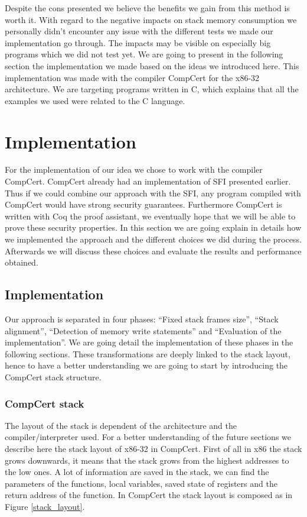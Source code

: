 \documentclass[11pt]{sdm}
\begin{document}
Despite the cons presented we believe the benefits we gain from this method is worth it. With regard to the negative impacts on stack memory consumption we personally didn't encounter any issue with the different tests we made our implementation go through. The impacts may be visible on especially big programs which we did not test yet.
We are going to present in the following section the implementation we made based on the ideas we introduced here. This implementation was made with the compiler CompCert for the x86-32 architecture. We are targeting programs written in C, which explains that all the examples we used were related to the C language.


\label{sec:section name}

\section{Implementation}
\label{sec:Implementation and analysis}

For the implementation of our idea we chose to work with the compiler CompCert. CompCert already had an implementation of SFI presented earlier. Thus if we could combine our approach with the SFI, any program compiled with CompCert would have strong security guarantees. Furthermore CompCert is written with Coq the proof assistant, we eventually hope that we will be able to prove these security properties. In this section we are going explain in details how we implemented the approach and the different choices we did during the process. Afterwards we will discuss these choices and evaluate the results and performance obtained.

\subsection{Implementation}
\label{sub:Implementation}
	Our approach is separated in four phases: ``Fixed stack frames size'', ``Stack alignment'', ``Detection of memory write statements'' and ``Evaluation of the implementation''. We are going detail the implementation of these phases in the following sections. These transformations are deeply linked to the stack layout, hence to have a better understanding we are going to start by introducing the CompCert stack structure.

\subsubsection{CompCert stack}
\label{ssub:CompCert stack}
	The layout of the stack is dependent of the architecture and the compiler/interpreter used. For a better understanding of the future sections we describe here the stack layout of x86-32 in CompCert.
First of all in x86 the stack grows downwards, it means that the stack grows from the highest addresses to the low ones.
A lot of information are saved in the stack, we can find the parameters of the functions, local variables, saved state of registers and the return address of the function.
In CompCert the stack layout is composed as in Figure \ref{stack_layout}.
\end{document}
